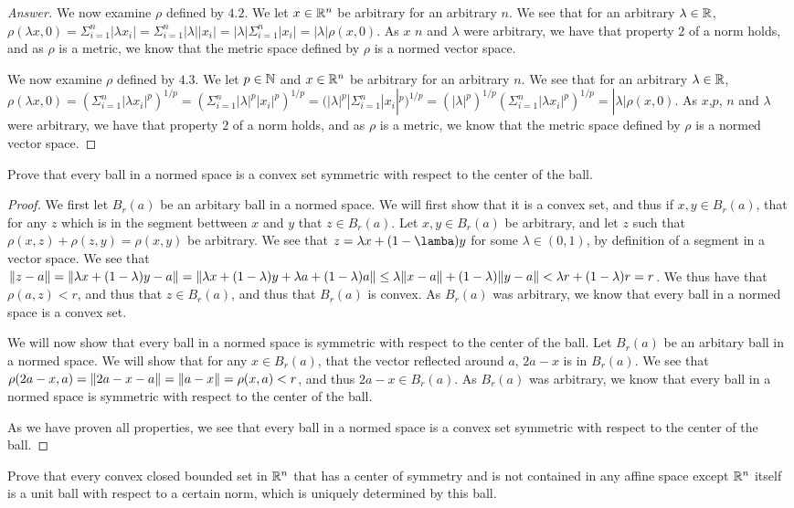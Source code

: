 \begin{proof}[Answer]
  We now examine $\rho$ defined by $4.2$. 
  We let $x\in \mathbb{R}^n$ be arbitrary for an arbitrary $n$. We see that 
  for an arbitrary $\lambda \in \mathbb{R}$, $\rho(\lambda x,0)=
  \Sigma_{i=1}^n|\lambda x_i| =
  \Sigma_{i=1}^n |\lambda| | x_i|=
  |\lambda| \Sigma_{i=1}^n | x_i|=
  |\lambda| \rho(x,0)$. As $x$  $n$ and $\lambda$ were arbitrary,
  we have that property $2$ of a norm holds, and as $\rho$ is a
  metric, we know that the metric space defined by $\rho$ is a normed
  vector space. 

  We now examine $\rho$ defined by $4.3$. 
  We let $p\in \mathbb{N}$ and $x\in \mathbb{R}^n$ be arbitrary
  for an arbitrary $n$. We see that 
  for an arbitrary $\lambda \in \mathbb{R}$, $\rho(\lambda x,0)=
  (\Sigma_{i=1}^n |\lambda x_i|^p)^{1/p} =
  (\Sigma_{i=1}^n |\lambda|^p |x_i|^p)^{1/p} =
 ( |\lambda|^p|\Sigma_{i=1}^n |x_i|^p)^{1/p} =
 ( |\lambda|^p)^{1/p}(\Sigma_{i=1}^n |\lambda x_i|^p)^{1/p} =
  |\lambda| \rho(x,0)$. As $x$,$p$, $n$ and $\lambda$ were arbitrary,
  we have that property $2$ of a norm holds, and as $\rho$ is a
  metric, we know that the metric space defined by $\rho$ is a normed
  vector space. 
\end{proof}

\begin{minorEx}%
    Prove that every ball in a normed space is a convex set symmetric with
    respect to the center of the ball.
\end{minorEx}

\begin{proof}
  We first let $B_r(a)$ be an arbitary ball in a normed space. We will
  first show that it is a convex set, and thus if $x,y\in B_r(a)$,
  that for any $z$ which is in the segment bettween $x$ and $y$
  that $z\in B_r(a)$. Let $x,y\in B_r(a)$ be arbitrary, and let $z$
  such that $\rho(x,z)+\rho(z,y)=\rho(x,y)$ be arbitrary. We see that
  $z= \lambda x + (1-\lamba)y$ for some $\lambda \in (0,1)$, by
  definition of a segment in a vector space. We see that 
  $\Vert z-a\Vert = \Vert\lambda x + (1-\lambda)y - a\Vert = \Vert\lambda
    x+ (1-\lambda)y + \lambda a + (1-\lambda) a\Vert \leq
  \lambda\Vert x-a\Vert + (1-\lambda)\Vert y-a\Vert< \lambda r + (1-\lambda)r
  = r$. We thus have that $\rho(a,z)< r$, and thus that $z\in B_r(a)$,
  and thus that $B_r(a)$ is convex. As $B_r(a)$ was arbitrary, we know
  that every ball in a normed space is a convex set.

  We will now show that every ball in a normed space is 
  symmetric with respect to the center of the ball.  Let $B_r(a)$ be
  an arbitary ball in a normed space. We will show that for any $x \in
  B_r(a)$, that the vector reflected around $a$, $2a -x$ is in
  $B_r(a)$. 
  We see that $\rho(2a-x,a)= \Vert2a-x -a\Vert = \Vert a-x\Vert=\rho(x,a)<r$,
  and thus $2a -x\in B_r(a)$. As $B_r(a)$ was arbitrary, we know that 
   every ball in a normed space is symmetric with respect to the
   center of the ball. 

   As we have proven all properties, we see that every ball in a
   normed space is a convex set symmetric with respect to the center
   of the ball.
\end{proof}

\begin{minorEx}
    Prove that every convex closed bounded set in $\mathbb{R}^n$ that has a center of
    symmetry and is not contained in any affine space except $\mathbb{R}^n$ itself is a
    unit ball with respect to a certain norm, which is uniquely determined by
    this ball.
\end{minorEx}
